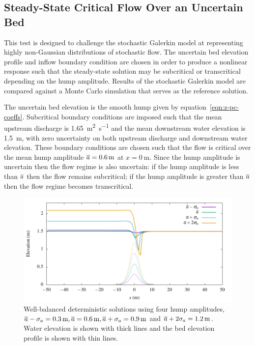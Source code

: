 \subsection{Steady-State Critical Flow Over an Uncertain Bed}

This test is designed to challenge the stochastic Galerkin model at representing highly non-Gaussian distributions of stochastic flow.
The uncertain bed elevation profile and inflow boundary condition are chosen in order to produce a nonlinear response such that the steady-state solution may be subcritical or transcritical depending on the hump amplitude.
Results of the stochastic Galerkin model are compared against a Monte Carlo simulation that serves as the reference solution.

The uncertain bed elevation is the smooth hump given by equation~\eqref{eqn:z-pc-coeffs}.
Subcritical boundary conditions are imposed such that the mean upstream discharge is \SI{1.65}{\meter\squared\per\second} and the mean downstream water elevation is \SI{1.5}{\meter}, with zero uncertainty on both upstream discharge and downstream water elevation.
These boundary conditions are chosen such that the flow is critical over the mean hump amplitude $\overline{a} = \SI{0.6}{\meter}$ at $x = \SI{0}{\meter}$.
Since the hump amplitude is uncertain then the flow regime is also uncertain: if the hump amplitude is less than $\overline{a}$ then the flow remains subcritical; if the hump amplitude is greater than $\overline{a}$ then the flow regime becomes transcritical.

\begin{figure}
    \centering
    \includegraphics{fig-criticalSteadyState-examples.pdf}
    \caption{Well-balanced deterministic solutions using four hump amplitudes, $\overline{a} - \sigma_a = \SI{0.3}{\meter}, \overline{a} = \SI{0.6}{\meter}, \overline{a}+\sigma_a = \SI{0.9}{\meter}$ and $\overline{a} + 2\sigma_a = \SI{1.2}{\meter}$.
    Water elevation is shown with thick lines and the bed elevation profile is shown with thin lines.}
    \label{fig:criticalSteadyState-examples}
\end{figure}

